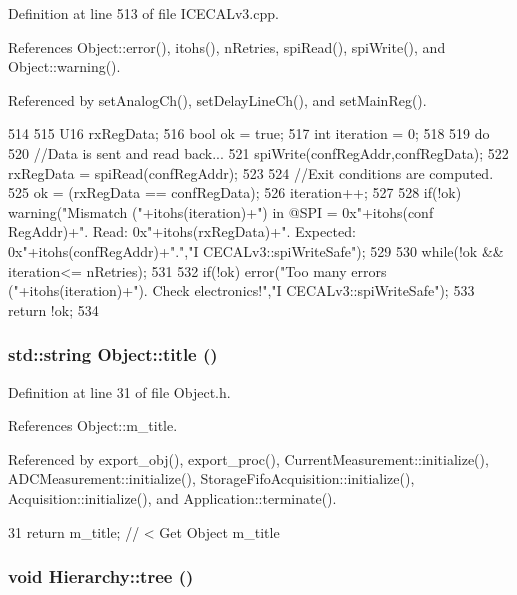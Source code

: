 Definition at line 513 of file ICECALv3.cpp.

References Object::error(), itohs(), nRetries, spiRead(), spiWrite(), and Object::warning().

Referenced by setAnalogCh(), setDelayLineCh(), and setMainReg().


\begin{DoxyCode}
514 {
515     U16 rxRegData;
516     bool ok = true;
517     int iteration = 0;
518 
519     do{
520         //Data is sent and read back...
521         spiWrite(confRegAddr,confRegData);  
522         rxRegData = spiRead(confRegAddr);
523 
524         //Exit conditions are computed.
525         ok = (rxRegData == confRegData);
526         iteration++;
527     
528         if(!ok) warning("Mismatch ("+itohs(iteration)+") in @SPI = 0x"+itohs(conf
      RegAddr)+". Read: 0x"+itohs(rxRegData)+". Expected: 0x"+itohs(confRegAddr)+".","I
      CECALv3::spiWriteSafe"); 
529 
530     }while(!ok && iteration<= nRetries);
531 
532     if(!ok) error("Too many errors ("+itohs(iteration)+"). Check electronics!","I
      CECALv3::spiWriteSafe");
533     return !ok;
534 }
\end{DoxyCode}
\hypertarget{classObject_a73a0f1a41828fdd8303dd662446fb6c3}{
\subsubsection[{title}]{\setlength{\rightskip}{0pt plus 5cm}std::string Object::title ()}}
\label{classObject_a73a0f1a41828fdd8303dd662446fb6c3}


Definition at line 31 of file Object.h.

References Object::m\_\-title.

Referenced by export\_\-obj(), export\_\-proc(), CurrentMeasurement::initialize(), ADCMeasurement::initialize(), StorageFifoAcquisition::initialize(), Acquisition::initialize(), and Application::terminate().


\begin{DoxyCode}
31 { return m_title;      } // < Get Object m_title
\end{DoxyCode}
\hypertarget{classHierarchy_a594c294c5f60c230e106d522ed008212}{
\subsubsection[{tree}]{\setlength{\rightskip}{0pt plus 5cm}void Hierarchy::tree ()}}
\label{classHierarchy_a594c294c5f60c230e106d522ed008212}


